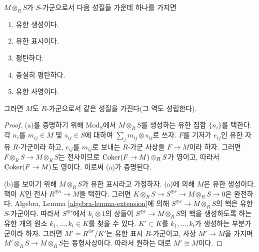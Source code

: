 \begin{theorem}
\label{theorem-descend-module-properties}
$M \otimes_R S$가 $S$-가군으로서 다음 성질들 가운데 하나를 가지면
\begin{enumerate}
\item[(a)]
유한 생성이다.
\item[(b)]
유한 표시이다.
\item[(c)]
평탄하다.
\item[(d)]
충실히 평탄하다.
\item[(e)]
유한 사영이다.
\end{enumerate}
그러면 $M$도 $R$-가군으로서 같은 성질을 가진다(그 역도 성립한다).
\end{theorem}

\begin{proof}
(a)를 증명하기 위해 $\text{Mod}_S$에서 $M \otimes_R S$를 생성하는 유한
집합 $\{n_i\}$를 택한다. 각 $n_i$를 $m_{ij} \in M$ 및 $s_{ij} \in S$에
대하여 $\sum_j m_{ij} \otimes s_{ij}$로 쓰자. $F$를 기저가 $e_{ij}$인
유한 자유 $R$-가군이라 하고, $e_{ij}$를 $m_{ij}$로 보내는 $R$-가군 사상을
$F \to M$이라 하자. 그러면 $F \otimes_R S\to M \otimes_R S$는
전사이므로 $\mathop{\mathrm{Coker}}(F \to M) \otimes_R S$가 영이고, 따라서
$\mathop{\mathrm{Coker}}(F \to M)$도 영이다. 이로써 (a)가 증명된다.

\medskip\noindent
(b)를 보이기 위해 $M \otimes_R S$가 유한 표시라고 가정하자. (a)에 의해
$M$은 유한 생성이다. 핵이 $K$인 전사 $R^{\oplus n} \to M$을 택한다.
그러면 $K \otimes_R S \to S^{\oplus r} \to M \otimes_R S \to 0$은
완전하다. Algebra, Lemma \ref{algebra-lemma-extension}에 의해
$S^{\oplus r} \to M \otimes_R S$의 핵은 유한 $S$-가군이다. 따라서
$S^{\oplus r}$에서 $k_i \otimes 1$의 상들이
$S^{\oplus r} \to M \otimes_R S$의 핵을 생성하도록 하는 유한 개의 원소
$k_1, \ldots, k_t \in K$를 찾을 수 있다. $K' \subset K$를
$k_1, \ldots, k_t$가 생성하는 부분가군이라 하자. 그러면
$M' = R^{\oplus r}/K'$는 유한 표시 $R$-가군이고, 사상 $M' \to M$을 가지며
$M' \otimes_R S \to M \otimes_R S$는 동형사상이다. 따라서 원하는 대로
$M' \cong M$이다.


\end{proof}
